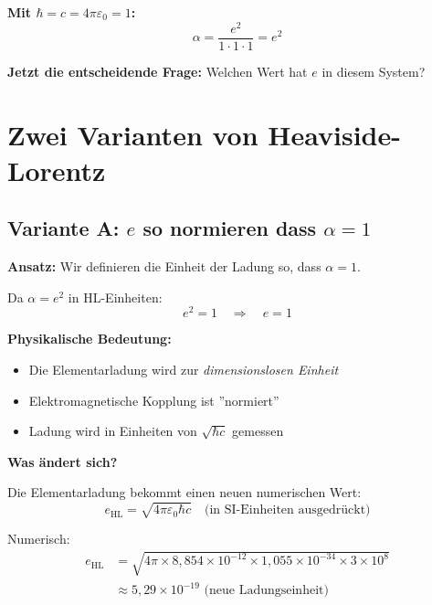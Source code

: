 	\textbf{Mit $\hbar = c = 4\pi\varepsilon_0 = 1$:}
	\begin{equation}
		\alpha = \frac{e^2}{1 \cdot 1 \cdot 1} = e^2
	\end{equation}
	
	\textbf{Jetzt die entscheidende Frage:} Welchen Wert hat $e$ in diesem System?
	
	\section[Zwei Varianten von Heaviside-Lorentz]{Zwei Varianten von Heaviside-Lorentz}
	
	\subsection[Variante A]{Variante A: $e$ so normieren dass $\alpha = 1$}
	
	\textbf{Ansatz:} Wir definieren die Einheit der Ladung so, dass $\alpha = 1$.
	
	Da $\alpha = e^2$ in HL-Einheiten:
	\begin{equation}
		e^2 = 1 \quad \Rightarrow \quad e = 1
	\end{equation}
	
	\textbf{Physikalische Bedeutung:}
	\begin{itemize}
		\item Die Elementarladung wird zur \textit{dimensionslosen Einheit}
		\item Elektromagnetische Kopplung ist ''normiert''
		\item Ladung wird in Einheiten von $\sqrt{\hbar c}$ gemessen
	\end{itemize}
	
	\textbf{Was ändert sich?}
	
	Die Elementarladung bekommt einen neuen numerischen Wert:
	\begin{equation}
		e_{\text{HL}} = \sqrt{4\pi\varepsilon_0\hbar c} \quad \text{(in SI-Einheiten ausgedrückt)}
	\end{equation}
	
	Numerisch:
	\begin{align}
		e_{\text{HL}} &= \sqrt{4\pi \times 8{,}854 \times 10^{-12} \times 1{,}055 \times 10^{-34} \times 3 \times 10^8} \\
		&\approx 5{,}29 \times 10^{-19} \text{ (neue Ladungseinheit)}
	\end{align}
	
